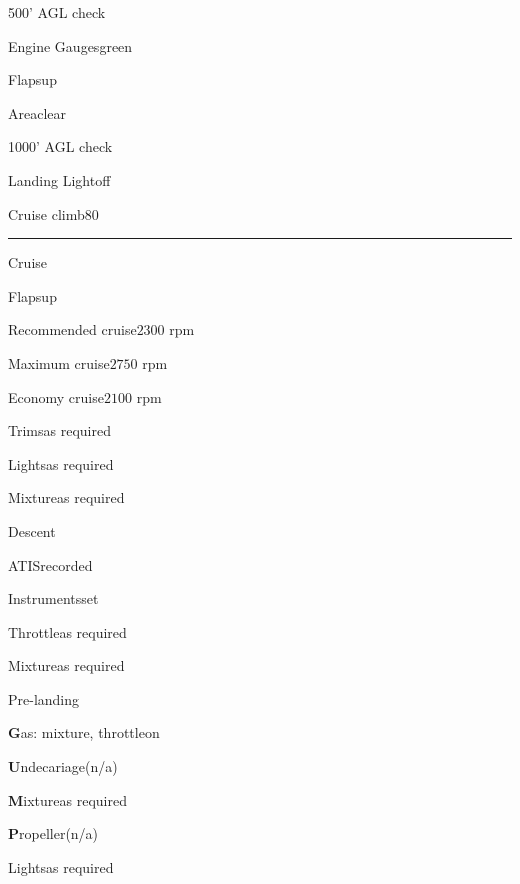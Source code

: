 \pagebreak

\begin{multicols}{2}
\begin{checklist}{500' AGL check}
    \item{Engine Gauges}{green}
    \item{Flaps}{up}
    \item{Area}{clear}
\end{checklist}

\begin{checklist}{1000' AGL check}
    \item{Landing Light}{off}
    \item{Cruise climb}{$80$}
\end{checklist}

\noindent\rule{0.9\linewidth}{0.4pt}
\vspace{0.5em}

\begin{checklist}{Cruise}
    \item{Flaps}{up}
    \item{Recommended cruise}{$2300$ rpm}
    \item{Maximum cruise}{$2750$ rpm}
    \item{Economy cruise}{$2100$ rpm}
    \item{Trims}{as required}
    \item{Lights}{as required}
    \item{Mixture}{as required}
\end{checklist}

\vfill\null
\columnbreak

\begin{checklist}{Descent}
    \item{ATIS}{recorded}
    \item{Instruments}{set}
    \item{Throttle}{as required}
    \item{Mixture}{as required}
\end{checklist}

\begin{checklist}{Pre-landing}
    \item{\textbf{G}as: mixture, throttle}{on}
    \item{\textbf{U}ndecariage}{(n/a)}
    \item{\textbf{M}ixture}{as required}
    \item{\textbf{P}ropeller}{(n/a)}
    \item{Lights}{as required}
\end{checklist}


\end{multicols}
